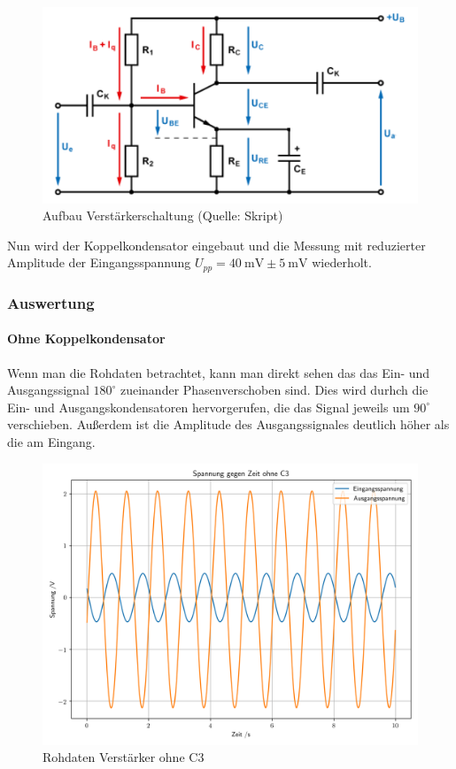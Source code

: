 \documentclass[12pt,twoside,a4paper]{scrartcl}
\begin{document}
			\begin{figure}[H]
				\centering
				\includegraphics[width = 0.8 \textwidth]{Pictures/amp}
				\caption{Aufbau Verstärkerschaltung (Quelle: Skript)}
			\end{figure}

			Nun wird der Koppelkondensator eingebaut und die Messung mit reduzierter Amplitude der Eingangsspannung $U_{pp} = \SI{40}{\milli \volt} \pm \SI{5}{\milli \volt}$ wiederholt.

			\subsubsection{Auswertung}

			\paragraph{Ohne Koppelkondensator}

				Wenn man die Rohdaten betrachtet, kann man direkt sehen das das Ein- und Ausgangssignal $180^{\circ}$ zueinander Phasenverschoben sind. Dies wird durhch die Ein- und Ausgangskondensatoren hervorgerufen, die das Signal jeweils um $90^{\circ}$ verschieben. Außerdem ist die Amplitude des Ausgangssignales deutlich höher als die am Eingang.

				\begin{figure}[H]
					\centering
					\includegraphics[width = 0.8 \textwidth]{Plots/amp/SpannungGegZeitohne C3}
					\caption{Rohdaten Verstärker ohne C3}
				\end{figure}
\end{document}
